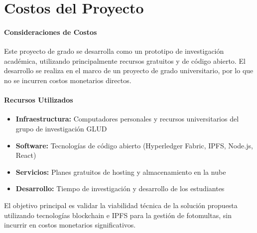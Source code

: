 \section{Costos del Proyecto}

\paragraph{Consideraciones de Costos}
Este proyecto de grado se desarrolla como un prototipo de investigación académica, utilizando principalmente recursos gratuitos y de código abierto. El desarrollo se realiza en el marco de un proyecto de grado universitario, por lo que no se incurren costos monetarios directos.

\paragraph{Recursos Utilizados}
\begin{itemize}
    \item \textbf{Infraestructura:} Computadores personales y recursos universitarios del grupo de investigación GLUD
    \item \textbf{Software:} Tecnologías de código abierto (Hyperledger Fabric, IPFS, Node.js, React)
    \item \textbf{Servicios:} Planes gratuitos de hosting y almacenamiento en la nube
    \item \textbf{Desarrollo:} Tiempo de investigación y desarrollo de los estudiantes
\end{itemize}

El objetivo principal es validar la viabilidad técnica de la solución propuesta utilizando tecnologías blockchain e IPFS para la gestión de fotomultas, sin incurrir en costos monetarios significativos. 